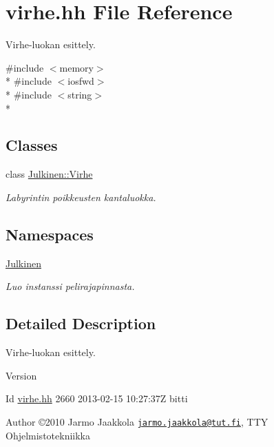 \hypertarget{virhe_8hh}{}\section{virhe.\+hh File Reference}
\label{virhe_8hh}


Virhe-\/luokan esittely.  


{\ttfamily \#include $<$memory$>$}\\*
{\ttfamily \#include $<$iosfwd$>$}\\*
{\ttfamily \#include $<$string$>$}\\*
\subsection*{Classes}
\begin{DoxyCompactItemize}
\item 
class \hyperlink{class_julkinen_1_1_virhe}{Julkinen\+::\+Virhe}
\begin{DoxyCompactList}\small\item\em Labyrintin poikkeusten kantaluokka. \end{DoxyCompactList}\end{DoxyCompactItemize}
\subsection*{Namespaces}
\begin{DoxyCompactItemize}
\item 
 \hyperlink{namespace_julkinen}{Julkinen}
\begin{DoxyCompactList}\small\item\em Luo instanssi pelirajapinnasta. \end{DoxyCompactList}\end{DoxyCompactItemize}


\subsection{Detailed Description}
Virhe-\/luokan esittely. 

\begin{DoxyVersion}{Version}

\end{DoxyVersion}
\begin{DoxyParagraph}{Id}
\hyperlink{virhe_8hh}{virhe.\+hh} 2660 2013-\/02-\/15 10\+:27\+:37\+Z bitti 
\end{DoxyParagraph}


\begin{DoxyAuthor}{Author}
©2010 Jarmo Jaakkola \href{mailto:jarmo.jaakkola@tut.fi}{\tt jarmo.\+jaakkola@tut.\+fi}, T\+T\+Y Ohjelmistotekniikka 
\end{DoxyAuthor}
